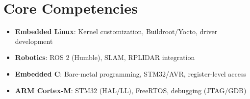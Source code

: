 \section{Core Competencies}
\begin{itemize}
  \item \textbf{Embedded Linux}: Kernel customization, Buildroot/Yocto, driver development
  \item \textbf{Robotics}: ROS 2 (Humble), SLAM, RPLIDAR integration  
  \item \textbf{Embedded C}: Bare-metal programming, STM32/AVR, register-level access
  \item \textbf{ARM Cortex-M}: STM32 (HAL/LL), FreeRTOS, debugging (JTAG/GDB)
\end{itemize}